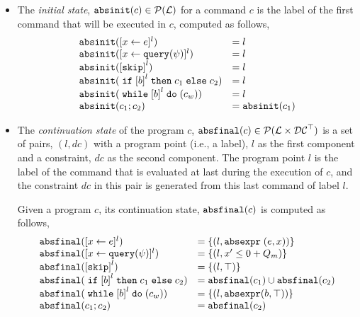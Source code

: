 \begin{itemize}
    \item The \emph{initial state}, $\mathtt{abs}{\mathtt{init}}(c) \in \mathcal{P}(\mathcal{L})$
    for a command $c$ is the label of the first command that will be executed in $c$,
    computed as follows,
   \[
    \begin{array}{ll}
    \absinit(\clabel{\assign{x}{\expr}}{}^l) & = l \\
    \absinit(\clabel{\assign{x}{\query(\qexpr)}}{}^l) & = l \\
    \absinit(\clabel{\eskip}^{l}) & = l \\
    \absinit(\eif \clabel{\bexpr}^{l} \ethen c_1 \eelse c_2) & = l\\
    \absinit(\ewhile \clabel{\bexpr}^{l} \edo (c_w)) & = l \\
    \absinit(c_1 ; c_2) & = \absinit(c_1) \\
    \end{array}
    \]
   \item The \emph{continuation state} of the program $c$, 
   $\mathtt{abs}{\mathtt{final}}(c) \in \mathcal{P}(\mathcal{L} \times \mathcal{DC}^{\top})$
   is a set of pairs, $(l, dc)$ with a
   program point (i.e., a label), $l$ as the first component and a constraint, 
   $dc$ as the second component.
   The program point $l$ is the label of the command that is evaluated at last during the execution of $c$,
   and the constraint $dc$ in this pair is generated from this last command of label $l$.
   
   Given a program $c$, its continuation state, $\mathtt{abs}{\mathtt{final}}(c)$ is computed as follows,
    \[
    \begin{array}{ll}
    \absfinal(\clabel{\assign{x}{\expr}}{}^l) & = \{(l, \absexpr\eapp (\expr, x))\} \\
    \absfinal(\clabel{\assign{x}{\query(\qexpr)}}{}^l) & = \{
    (l, x' \leq 0 + Q_m )\} \\
    \absfinal(\clabel{\eskip}^{l}) 
    & = \{(l, \top)\} \\
    \absfinal(\eif \clabel{\bexpr}^{l} \ethen c_1 \eelse c_2) & = \absfinal(c_1) \cup \absfinal(c_2) \\
    \absfinal(\ewhile \clabel{\bexpr}^{l} \edo (c_w)) & = \{(l, \absexpr(\bexpr, \top))\} \\
    \absfinal(c_1 ; c_2) & = \absfinal(c_2) \\
    \end{array}
    \]
   \end{itemize}

